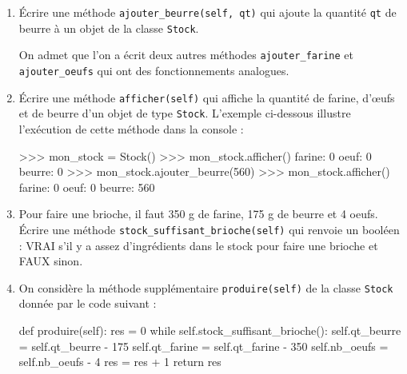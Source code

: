 \documentclass[
  a4paper,
  DIV=11,
  numbers=noendperiod]{scrartcl}
\newenvironment{Shaded}{\begin{snugshade}}{\end{snugshade}}
\newcommand{\ControlFlowTok}[1]{\textcolor[rgb]{0.00,0.23,0.31}{#1}}
\newcommand{\DecValTok}[1]{\textcolor[rgb]{0.68,0.00,0.00}{#1}}
\newcommand{\KeywordTok}[1]{\textcolor[rgb]{0.00,0.23,0.31}{#1}}
\newcommand{\NormalTok}[1]{\textcolor[rgb]{0.00,0.23,0.31}{#1}}
\newcommand{\OperatorTok}[1]{\textcolor[rgb]{0.37,0.37,0.37}{#1}}
\newcommand{\VariableTok}[1]{\textcolor[rgb]{0.07,0.07,0.07}{#1}}
\begin{document}
\begin{enumerate}
\def\labelenumi{\arabic{enumi}.}
\item
  Écrire une méthode \texttt{ajouter\_beurre(self,\ qt)} qui ajoute la
  quantité \texttt{qt} de beurre à un objet de la classe \texttt{Stock}.

  On admet que l'on a écrit deux autres méthodes
  \texttt{ajouter\_farine} et \texttt{ajouter\_oeufs} qui ont des
  fonctionnements analogues.
\item
  Écrire une méthode \texttt{afficher(self)} qui affiche la quantité de
  farine, d'œufs et de beurre d'un objet de type \texttt{Stock}.
  L'exemple ci-dessous illustre l'exécution de cette méthode dans la
  console :

\begin{Shaded}
\begin{Highlighting}[]
\OperatorTok{\textgreater{}\textgreater{}\textgreater{}}\NormalTok{ mon\_stock }\OperatorTok{=}\NormalTok{ Stock() }
\OperatorTok{\textgreater{}\textgreater{}\textgreater{}}\NormalTok{ mon\_stock.afficher() }
\NormalTok{farine: }\DecValTok{0} 
\NormalTok{oeuf: }\DecValTok{0} 
\NormalTok{beurre: }\DecValTok{0} 
\OperatorTok{\textgreater{}\textgreater{}\textgreater{}}\NormalTok{ mon\_stock.ajouter\_beurre(}\DecValTok{560}\NormalTok{) }
\OperatorTok{\textgreater{}\textgreater{}\textgreater{}}\NormalTok{ mon\_stock.afficher() }
\NormalTok{farine: }\DecValTok{0} 
\NormalTok{oeuf: }\DecValTok{0} 
\NormalTok{beurre: }\DecValTok{560} 
\end{Highlighting}
\end{Shaded}
\item
  Pour faire une brioche, il faut 350 g de farine, 175 g de beurre et 4
  oeufs. Écrire une méthode \texttt{stock\_suffisant\_brioche(self)} qui
  renvoie un booléen : VRAI s'il y a assez d'ingrédients dans le stock
  pour faire une brioche et FAUX sinon.
\item
  On considère la méthode supplémentaire \texttt{produire(self)} de la
  classe \texttt{Stock} donnée par le code suivant :

\begin{Shaded}
\begin{Highlighting}[]
\KeywordTok{def}\NormalTok{ produire(}\VariableTok{self}\NormalTok{):}
\NormalTok{    res }\OperatorTok{=} \DecValTok{0} 
    \ControlFlowTok{while} \VariableTok{self}\NormalTok{.stock\_suffisant\_brioche():}
        \VariableTok{self}\NormalTok{.qt\_beurre }\OperatorTok{=} \VariableTok{self}\NormalTok{.qt\_beurre }\OperatorTok{{-}} \DecValTok{175} 
        \VariableTok{self}\NormalTok{.qt\_farine }\OperatorTok{=} \VariableTok{self}\NormalTok{.qt\_farine }\OperatorTok{{-}} \DecValTok{350} 
        \VariableTok{self}\NormalTok{.nb\_oeufs }\OperatorTok{=} \VariableTok{self}\NormalTok{.nb\_oeufs }\OperatorTok{{-}} \DecValTok{4} 
\NormalTok{        res }\OperatorTok{=}\NormalTok{ res }\OperatorTok{+} \DecValTok{1}
    \ControlFlowTok{return}\NormalTok{ res}
\end{Highlighting}
\end{Shaded}


\end{enumerate}
\end{document}
